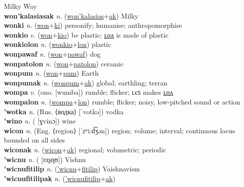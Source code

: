 Milky Way \label{won'kalasias} \\
\textbf{won'kalasiasak} \textit{n.} (\hyperref[won'kalasias]{won'kalasias}+\hyperref[ak]{ak})
Milky \label{won'kalasiasak} \\
\textbf{wonki} \textit{n.} (\hyperref[won]{won}+\hyperref[ki]{ki})
personify; humanise; anthropomorphise \label{wonki} \\
\textbf{wonkio} \textit{v.} (\hyperref[won]{won}+\hyperref[kio]{kio})
be plastic; \hyperref[wonkiolon]{ʟᴏᴧ} is made of plastic \label{wonkio} \\
\textbf{wonkiolon} \textit{n.} (\hyperref[wonkio]{wonkio}+\hyperref[lon]{lon})
plastic \label{wonkiolon} \\
\textbf{wonpawaf} \textit{n.} (\hyperref[won]{won}+\hyperref[pawaf]{pawaf})
dog \label{wonpawaf} \\
\textbf{wonpatolon} \textit{n.} (\hyperref[won]{won}+\hyperref[patolon]{patolon})
ceramic \label{wonpatolon} \\
\textbf{wonpum} \textit{n.} (\hyperref[won]{won}+\hyperref[pum]{pum})
Earth \label{wonpum} \\
\textbf{wonpumak} \textit{n.} (\hyperref[wonpum]{wonpum}+\hyperref[ak]{ak})
global; earthling; terran \label{wonpumak} \\
\textbf{wompa} \textit{v.} (ono. [wumba])
rumble; flicker; ʟєꜱ makes \hyperref[wompalon]{ʟᴏᴧ} \label{wompa} \\
\textbf{wompalon} \textit{n.} (\hyperref[wompa]{wompa}+\hyperref[lon]{lon})
rumble; flicker; noisy, low-pitched sound or action \label{wompalon} \\
\textbf{'wotka} \textit{n.} (Rus. ⟨водка⟩ [ˈvotkə])
vodka \label{'wotka} \\
\textbf{'wino} \textit{n.} ( [ɣvinɔ])
wine \label{'wino} \\
\textbf{wicon} \textit{n.} (Eng. ⟨region⟩ [ˈɹʷiːd͡ʒən])
region; volume; interval; continuous locus bounded on all sides \label{wicon} \\
\textbf{wiconak} \textit{n.} (\hyperref[wicon]{wicon}+\hyperref[ak]{ak})
regional; volumetric; periodic \label{wiconak} \\
\textbf{'wicnu} \textit{n.} ( [ʋɪʂɳʊ])
Vishnu \label{'wicnu} \\
\textbf{'wicnufitilip} \textit{n.} (\hyperref['wicnu]{'wicnu}+\hyperref[fitilip]{fitilip})
Vaishnavism \label{'wicnufitilip} \\
\textbf{'wicnufitilipak} \textit{n.} (\hyperref['wicnufitilip]{'wicnufitilip}+\hyperref[ak]{ak})

